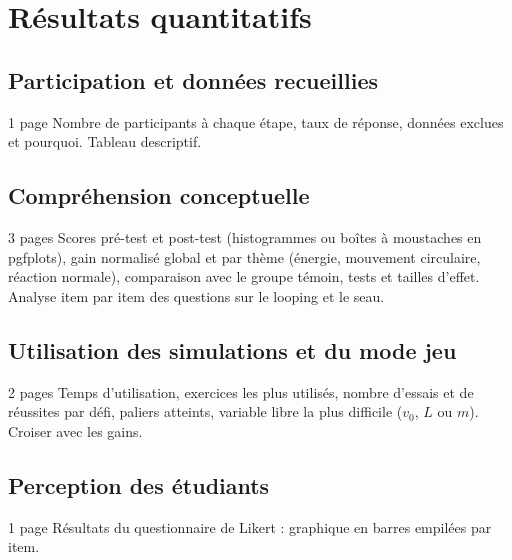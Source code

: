 
\chapter{Résultats quantitatifs}
\label{chap:resultats-quantitatifs}

\section{Participation et données recueillies}

\begin{arediger}{1 page}
Nombre de participants à chaque étape, taux de réponse, données exclues et
pourquoi. Tableau descriptif.
\end{arediger}

\section{Compréhension conceptuelle}

\begin{arediger}{3 pages}
Scores pré-test et post-test (histogrammes ou boîtes à moustaches en
pgfplots), gain normalisé global et par thème (énergie, mouvement circulaire,
réaction normale), comparaison avec le groupe témoin, tests et tailles
d'effet. Analyse item par item des questions sur le looping et le seau.
\end{arediger}

\section{Utilisation des simulations et du mode jeu}

\begin{arediger}{2 pages}
Temps d'utilisation, exercices les plus utilisés, nombre d'essais et de
réussites par défi, paliers atteints, variable libre la plus difficile
(\(v_0\), \(L\) ou \(m\)). Croiser avec les gains.
\end{arediger}

\section{Perception des étudiants}

\begin{arediger}{1 page}
Résultats du questionnaire de Likert : graphique en barres empilées par item.
\end{arediger}
